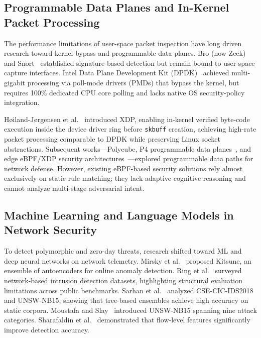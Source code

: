 \documentclass{ieeeaccess}
\renewcommand{\_}{\textunderscore\allowbreak}
\begin{document}
\subsection{Programmable Data Planes and In-Kernel Packet Processing}
The performance limitations of user-space packet inspection have long driven
research toward kernel bypass and programmable data planes. Bro (now
Zeek)~\cite{paxson1999bro} and Snort~\cite{roesch1999snort} established
signature-based detection but remain bound to user-space capture interfaces.
Intel Data Plane Development Kit (DPDK)~\cite{intel2022dpdk} achieved
multi-gigabit processing via poll-mode drivers (PMDs) that bypass the kernel,
but requires 100\% dedicated CPU core polling and lacks native OS
security-policy integration.

H{\o}iland-J{\o}rgensen et al.~\cite{hoiland2018express} introduced XDP, enabling
in-kernel verified byte-code execution inside the device driver ring before
\texttt{sk\_buff} creation, achieving high-rate packet processing comparable to DPDK
while preserving Linux socket abstractions. Subsequent works---Polycube, P4
programmable data planes~\cite{bosshart2014p4}, and edge eBPF/XDP security
architectures~\cite{vieira2020fast,miano2018introducing,miano2018creating}---explored programmable
data paths for network defense. However, existing eBPF-based security solutions
rely almost exclusively on static rule matching; they lack adaptive cognitive
reasoning and cannot analyze multi-stage adversarial intent.

\subsection{Machine Learning and Language Models in Network Security}
To detect polymorphic and zero-day threats, research shifted toward ML and deep
neural networks on network telemetry. Mirsky et al.~\cite{mirsky2018kitsune}
proposed Kitsune, an ensemble of autoencoders for online anomaly detection.
Ring et al.~\cite{ring2019survey} surveyed network-based intrusion detection
datasets, highlighting structural evaluation limitations across public benchmarks.
Sarhan et al.~\cite{sarhan2022standard} analyzed CSE-CIC-IDS2018 and UNSW-NB15,
showing that tree-based ensembles achieve high accuracy on static corpora.
Moustafa and Slay~\cite{moustafa2015unsw} introduced UNSW-NB15 spanning nine
attack categories. Sharafaldin et al.~\cite{sharafaldin2018toward} demonstrated
that flow-level features significantly improve detection accuracy.
\end{document}
